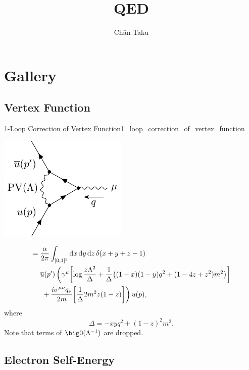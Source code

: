 \documentclass{article}
\title{QED}
\author{Ch\=an Taku}
\begin{document}
\maketitle

\section{Gallery}

\subsection{Vertex Function}

\begin{proposition}{1-Loop Correction of Vertex Function}{1_loop_correction_of_vertex_function}
    \begin{center}
        \includegraphics{img/vertex/vertex-1L.pdf}
    \end{center}
    \begin{align*}
        &= \frac{\alpha}{2\pi} \int_{[0,1]^3} \dd{x} \dd{y} \dd{z} \delta(x+y+z - 1) \\
        &\phantom{{}={}} \overline{u}(p')
        \left(
            \gamma^\mu\qty[\log \frac{z\Lambda^2}{\Delta} + \frac{1}{\Delta}\qty((1-x)(1-y)q^2 + (1-4z+z^2)m^2)] \vphantom{\frac{i\sigma^{\mu\nu}q_\nu}{2m}\qty[\frac{1}{\Delta}2m^2 z(1-z)]}
        \right. \\
        &\phantom{{}={}} \left.
        {} + {} \frac{i\sigma^{\mu\nu}q_\nu}{2m}\qty[\frac{1}{\Delta}2m^2 z(1-z)] \vphantom{\gamma^\mu\qty[\log \frac{z\Lambda^2}{\Delta} + \frac{1}{\Delta}\qty((1-x)(1-y)q^2 + (1-4z+z^2)m^2)]}
        \right)
        u(p),
    \end{align*}
    where
    \[ \Delta = -xyq^2 + (1-z)^2 m^2. \]
    Note that terms of $\bigO(\Lambda^{-1})$ are dropped.
\end{proposition}

\subsection{Electron Self-Energy}
\end{document}
